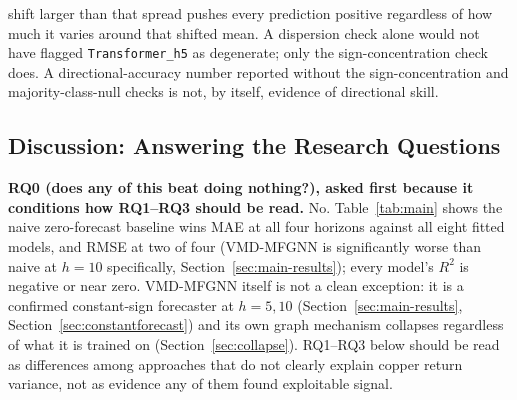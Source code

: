 \documentclass[journal]{IEEEtran}
\begin{document}
shift larger than that spread pushes every prediction positive regardless of how much it varies around that shifted mean. A dispersion check alone would not have flagged \texttt{Transformer\_h5} as degenerate; only the sign-concentration check does. A directional-accuracy number reported without the sign-concentration and majority-class-null checks is not, by itself, evidence of directional skill.

\subsection{Discussion: Answering the Research Questions}
\label{sec:discussion}

\textbf{RQ0 (does any of this beat doing nothing?), asked first because it conditions how RQ1--RQ3 should be read.} No. Table~\ref{tab:main} shows the naive zero-forecast baseline wins MAE at all four horizons against all eight fitted models, and RMSE at two of four (VMD-MFGNN is significantly worse than naive at $h=10$ specifically, Section~\ref{sec:main-results}); every model's $R^2$ is negative or near zero. VMD-MFGNN itself is not a clean exception: it is a confirmed constant-sign forecaster at $h=5,10$ (Section~\ref{sec:main-results}, Section~\ref{sec:constantforecast}) and its own graph mechanism collapses regardless of what it is trained on (Section~\ref{sec:collapse}). RQ1--RQ3 below should be read as differences among approaches that do not clearly explain copper return variance, not as evidence any of them found exploitable signal.
\end{document}
